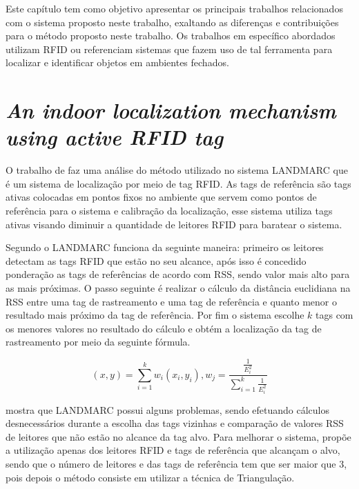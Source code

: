 
\label{chapter:correlatos}

Este capítulo tem como objetivo apresentar os principais trabalhos relacionados com o sistema proposto neste trabalho, 
exaltando as diferenças e contribuições para o método proposto neste trabalho. Os trabalhos em específico abordados 
utilizam RFID ou referenciam sistemas que fazem uso de tal ferramenta para localizar e identificar objetos em ambientes 
fechados.

%
%
\section{\textit{An indoor localization mechanism using active RFID tag}}

O trabalho de  faz uma análise do método utilizado no sistema LANDMARC 
que é um sistema de localização por meio de tag RFID. As tags de referência são tags ativas colocadas em pontos fixos no ambiente
que servem como pontos de referência para o sistema e calibração da localização, esse sistema utiliza tags ativas visando 
diminuir a quantidade de leitores RFID para baratear o sistema.

Segundo  o LANDMARC funciona da seguinte maneira: primeiro os leitores detectam as tags RFID que estão 
no seu alcance, após isso é concedido ponderação as tags de referências de acordo com RSS, sendo valor mais alto para as mais 
próximas. O passo seguinte é realizar o cálculo da distância euclidiana na RSS entre uma tag de rastreamento e uma tag de 
referência e quanto menor o resultado mais próximo da tag de referência. Por fim o sistema escolhe $k$ tags com os menores valores no 
resultado do cálculo e obtém a localização da tag de rastreamento por meio da seguinte fórmula.

\begin{equation}
(x,y) = \sum^k_{i=1}w_i(x_i,y_i), w_j=\frac{\frac{1}{E_i^2}}{\sum_{i=1}^k\frac{1}{E^2_i}} 
\end{equation}


 mostra que LANDMARC possui alguns problemas, sendo efetuando cálculos desnecessários 
durante a escolha das tags vizinhas e comparação de valores RSS de leitores que não estão no alcance da tag alvo. 
Para melhorar o sistema,  propõe a utilização apenas dos leitores RFID  e tags de referência 
que alcançam o alvo, sendo que o número de leitores e das tags de referência tem que ser maior que 
$3$, pois depois o método consiste em utilizar a técnica de Triangulação.


